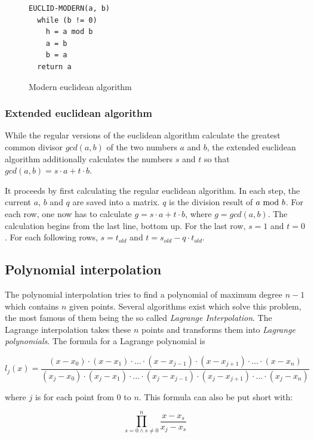 \begin{figure}
\begin{lstlisting}
EUCLID-MODERN(a, b)
  while (b != 0)
    h = a mod b
    a = b
    b = a
  return a
\end{lstlisting}
\caption{Modern euclidean algorithm}
\label{code:euclid_modern}
\end{figure}

\subsubsection{Extended euclidean algorithm}

While the regular versions of the euclidean algorithm calculate the greatest
common divisor $gcd(a, b)$ of the two numbers $a$ and $b$, the extended
euclidean algorithm additionally calculates the numbers $s$ and $t$ so
that $gcd(a, b) = s \cdot a + t \cdot b$.

It proceeds by first calculating the regular euclidean algorithm. In each
step, the current $a$, $b$ and $q$ are saved into a matrix. $q$ is the division
result of $a \ \text{mod}\ b$. For each row, one now has to calculate
$g = s \cdot a + t \cdot b$, where $g = gcd(a, b)$. The calculation begins from
the last line, bottom up. For the last row, $s = 1$ and $t = 0$. For each
following rows, $s = t_{old}$ and $t = s_{old} - q \cdot t_{old}$.

\subsection{Polynomial interpolation}

The polynomial interpolation tries to find a polynomial of maximum degree $n - 1$ which
contains $n$ given points. Several algorithms exist which solve this problem,
the most famous of them being the so called \textit{Lagrange Interpolation}. The
Lagrange interpolation takes these $n$ points and transforms them into \textit{Lagrange
polynomials}. The formula for a Lagrange polynomial is

$$l_j(x) = \frac{(x - x_0) \cdot (x - x_1) \cdot \ldots \cdot (x - x_{j - 1}) \cdot (x - x_{j + 1}) \cdot \ldots \cdot (x - x_n)}
{(x_j - x_0) \cdot (x_j - x_1) \cdot \ldots \cdot (x_j - x_{j - 1}) \cdot (x_j - x_{j + 1}) \cdot \ldots \cdot (x_j - x_n)}$$

where $j$ is for each point from $0$ to $n$. This formula can also be put short with:

$$\prod_{s = 0 \wedge s \neq 0}^{n} \frac{x - x_s}{x_j - x_s}$$

